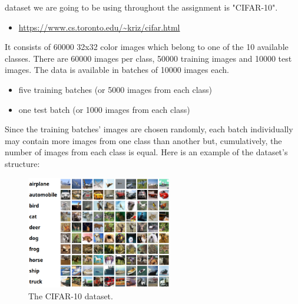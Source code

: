  dataset we are going to be using throughout the assignment is "CIFAR-10".
\begin{itemize}
  \item \url{https://www.cs.toronto.edu/~kriz/cifar.html}
\end{itemize}

It consists of 60000 32x32 color images which belong to one of the 10 available classes. There are 
60000 images per class, 50000 training images and 10000 test images. The data is available in batches of 
10000 images each.
\begin{itemize}
  \item five training batches (or 5000 images from each class)
  \item one test batch (or 1000 images from each class)
\end{itemize}
Since the training batches' images are chosen randomly, each batch individually may contain more images 
from one class than another but, cumulatively, the number of images from each class is equal. 
Here is an example of the dataset's structure:

\begin{figure}[H]
  \centering
  \includegraphics[width=2.5in]{cifar10_example.png}
  \caption{The CIFAR-10 dataset.}
  \label{CIFAR example}
\end{figure}